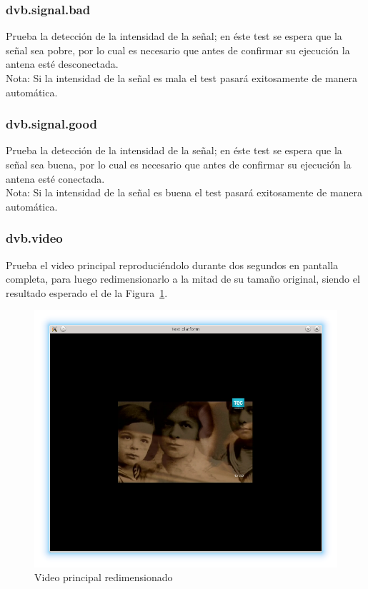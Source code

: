\documentclass{article}
\begin{document}
\FloatBarrier

\subsubsection{dvb.signal.bad}
Prueba la detección de la intensidad de la señal; en éste test se espera que la señal sea pobre, por lo cual es necesario que antes de confirmar su ejecución la antena esté desconectada.\\
Nota: Si la intensidad de la señal es mala el test pasará exitosamente de manera automática.

\FloatBarrier

\subsubsection{dvb.signal.good}
Prueba la detección de la intensidad de la señal; en éste test se espera que la señal sea buena, por lo cual es necesario que antes de confirmar su ejecución la antena esté conectada.\\
Nota: Si la intensidad de la señal es buena el test pasará exitosamente de manera automática.

\FloatBarrier

\subsubsection{dvb.video}
Prueba el video principal reproduciéndolo durante dos segundos en pantalla completa, para luego redimensionarlo a la mitad de su tamaño original, siendo el resultado esperado el de la Figura~\ref{fig:dvb_video_resize}.

\begin{figure}[h]
\centering
\includegraphics[scale=0.45]{resize_video}
\caption{Video principal redimensionado}
\label{fig:dvb_video_resize}
\end{figure}
\end{document}
